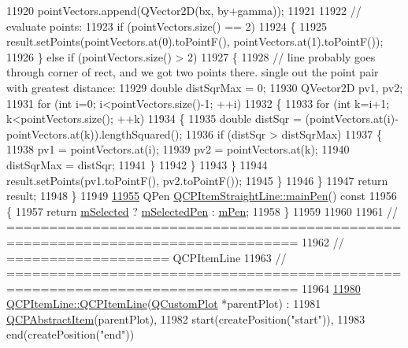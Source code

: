 \begin{DoxyCode}
11920       pointVectors.append(QVector2D(bx, by+gamma));
11921     
11922     \textcolor{comment}{// evaluate points:}
11923     \textcolor{keywordflow}{if} (pointVectors.size() == 2)
11924     \{
11925       result.setPoints(pointVectors.at(0).toPointF(), pointVectors.at(1).toPointF());
11926     \} \textcolor{keywordflow}{else} \textcolor{keywordflow}{if} (pointVectors.size() > 2)
11927     \{
11928       \textcolor{comment}{// line probably goes through corner of rect, and we got two points there. single out the point pair
       with greatest distance:}
11929       \textcolor{keywordtype}{double} distSqrMax = 0;
11930       QVector2D pv1, pv2;
11931       \textcolor{keywordflow}{for} (\textcolor{keywordtype}{int} i=0; i<pointVectors.size()-1; ++i)
11932       \{
11933         \textcolor{keywordflow}{for} (\textcolor{keywordtype}{int} k=i+1; k<pointVectors.size(); ++k)
11934         \{
11935           \textcolor{keywordtype}{double} distSqr = (pointVectors.at(i)-pointVectors.at(k)).lengthSquared();
11936           \textcolor{keywordflow}{if} (distSqr > distSqrMax)
11937           \{
11938             pv1 = pointVectors.at(i);
11939             pv2 = pointVectors.at(k);
11940             distSqrMax = distSqr;
11941           \}
11942         \}
11943       \}
11944       result.setPoints(pv1.toPointF(), pv2.toPointF());
11945     \}
11946   \}
11947   \textcolor{keywordflow}{return} result;
11948 \}
11949 
\hypertarget{a00115_source_l11955}{}\hyperlink{a00040_a63ef39814c5b560dbb7b13e3fec1d940}{11955} QPen \hyperlink{a00040_a63ef39814c5b560dbb7b13e3fec1d940}{QCPItemStraightLine::mainPen}()\textcolor{keyword}{ const}
11956 \textcolor{keyword}{}\{
11957   \textcolor{keywordflow}{return} \hyperlink{a00022_a4bdb3457dad1d268c0f78a44152b9645}{mSelected} ? \hyperlink{a00040_a0307a0d56a018656adbf798bc84c2a4b}{mSelectedPen} : \hyperlink{a00040_a15106ddc2ebd73ed5c1bc57aa92bee8f}{mPen};
11958 \}
11959 
11960 
11961 \textcolor{comment}{// ================================================================================}
11962 \textcolor{comment}{// =================== QCPItemLine}
11963 \textcolor{comment}{// ================================================================================}
11964 
\hypertarget{a00115_source_l11980}{}\hyperlink{a00036_a17804b7f64961c6accf25b61e85142e3}{11980} \hyperlink{a00036_a17804b7f64961c6accf25b61e85142e3}{QCPItemLine::QCPItemLine}(\hyperlink{a00030_d8/d00/a00186}{QCustomPlot} *parentPlot) :
11981   \hyperlink{a00022}{QCPAbstractItem}(parentPlot),
11982   start(createPosition(\textcolor{stringliteral}{"start"})),
11983   end(createPosition(\textcolor{stringliteral}{"end"}))

\end{DoxyCode}
